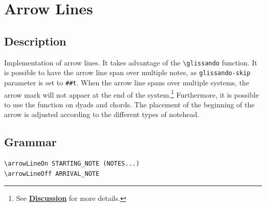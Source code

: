 \vfill \break




\section {Arrow Lines}
\label{sec:arrow_lines}
\hfill

\subsection{Description}
Implementation of arrow lines. It takes advantage of the \verb|\glissando| function. It is possible to have the arrow line span over multiple notes, as \verb|glissando-skip| parameter is set to \verb|##t|. When the arrow line spans over multiple systems, the arrow mark will not appaer at the end of the system.\footnote{See \hyperref[sec:arrow_lines_discussion]{\textbf{Discussion}} for more details.} Furthermore, it is possible to use the function on dyads and chords. The placement of the beginning of the arrow is adjusted according to the different types of notehead. 
\subsection{Grammar}
\begin{verbatim}
\arrowLineOn STARTING_NOTE (NOTES...)
\arrowLineOff ARRIVAL_NOTE
\end{verbatim}



